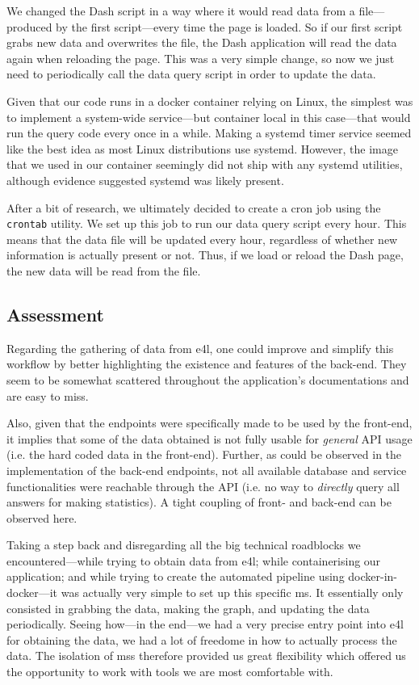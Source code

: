 We changed the Dash script in a way where it would read data from a
file---produced by the first script---every time the page is loaded.
So if our first script grabs new data and overwrites the file, the
Dash application will read the data again when reloading the page.
This was a very simple change, so now we just need to periodically
call the data query script in order to update the data.

Given that our code runs in a docker container relying on Linux, the
simplest was to implement a system-wide service---but container local
in this case---that would run the query code every once in a while.
Making a systemd timer service seemed like the best idea as most Linux
distributions use systemd. However, the image that we used in our
container seemingly did not ship with any systemd utilities, although
evidence suggested systemd was likely present.

After a bit of research, we ultimately decided to create a cron job
using the \verb|crontab| utility. We set up this job to run our data
query script every hour. This means that the data file will be updated
every hour, regardless of whether new information is actually present
or not. Thus, if we load or reload the Dash page, the new data will be
read from the file.

\subsection{Assessment}

Regarding the gathering of data from \gls{e4l}, one could improve and
simplify this workflow by better highlighting the existence and
features of the back-end. They seem to be somewhat scattered
throughout the application's documentations and are easy to miss.

Also, given that the endpoints were specifically made to be used by
the front-end, it implies that some of the data obtained is not fully
usable for \textit{general} API usage (i.e. the hard coded data in the
front-end). Further, as could be observed in the implementation of the
back-end endpoints, not all available database and service
functionalities were reachable through the API (i.e. no way to
\emph{directly} query all answers for making statistics). A tight coupling of
front- and back-end can be observed here.

Taking a step back and disregarding all the big technical roadblocks
we encountered---while trying to obtain data from \gls{e4l}; while
containerising our application; and while trying to create the automated
pipeline using docker-in-docker---it was actually very simple to set up
this specific \gls{ms}. It essentially only consisted in grabbing the
data, making the graph, and updating the data periodically. Seeing
how---in the end---we had a very precise entry point into \gls{e4l}
for obtaining the data, we had a lot of freedome in how to actually
process the data. The isolation of \glspl{ms} therefore provided us
great flexibility which offered us the opportunity to work with tools
we are most comfortable with.


